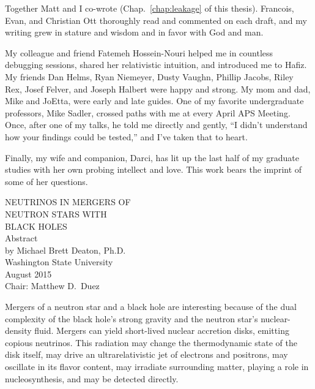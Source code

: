 \documentclass[12pt]{report}
\begin{document}
  Together Matt and I co-wrote \citealt{deat2013-leakage}
  (Chap.~\ref{chap:leakage} of this thesis).
  Francois, Evan, and Christian Ott
  thoroughly read and commented on each draft,
  and my writing grew in stature and wisdom and in favor with God and man.

  My colleague and friend Fatemeh Hossein-Nouri helped me in countless debugging
  sessions, shared her relativistic intuition, and introduced me to Hafiz.
  My friends Dan Helms, Ryan Niemeyer, Dusty Vaughn, Phillip Jacobs, Riley
  Rex, Josef Felver, and Joseph Halbert were happy and strong.
  My mom and dad, Mike and JoEtta, were early and late guides.
  One of my favorite undergraduate professors, Mike Sadler, crossed paths with me
  at every April APS Meeting. Once, after one of my talks,
  he told me directly and gently, ``I didn't understand how your findings could
  be tested,'' and I've taken that to heart.

  Finally, my wife and companion, Darci, has lit up the last half of my graduate
  studies with her own probing intellect and love. This work bears the imprint
  of some of her questions.

\newpage

\begin{center}
  \begin{singlespace}
    \label{ssec:abstract}

    {\uppercase{
        Neutrinos in Mergers of\\
        \bigskip
        Neutron Stars with\\
        \bigskip
        Black Holes}}\\
    \bigskip
    Abstract\\
    \bigskip \bigskip \bigskip
    by Michael Brett Deaton, Ph.D.\\
    Washington State University\\
    August 2015\\
    \bigskip \bigskip \bigskip
    Chair: Matthew D.\ Duez
  \end{singlespace}
\end{center}
  
Mergers of a neutron star and a black hole are interesting because of the dual
complexity of the black hole's strong gravity and the neutron star's
nuclear-density fluid.
Mergers can yield short-lived nuclear accretion disks, emitting copious neutrinos.
This radiation
may change the thermodynamic state of the disk itself,
may drive an ultrarelativistic jet of electrons and positrons,
may oscillate in its flavor content,
may irradiate surrounding matter, playing a role in nucleosynthesis,
and may be detected directly.
\end{document}
